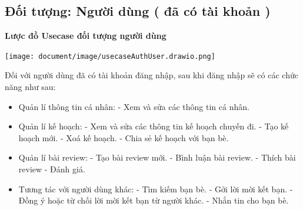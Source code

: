 \clearpage
\subsection{Đối tượng: Người dùng ( đã có tài khoản )}
\textbf{Lược đồ Usecase đối tượng người dùng}
\begin{center}
  \captionsetup{type=figure}
  \texttt{[image: document/image/usecaseAuthUser.drawio.png]}
\end{center}

Đối với người dùng đã có tài khoản đăng nhập, sau khi đăng nhập sẽ  có các chức năng như sau: 
\begin{itemize}
    \item Quản lí thông tin cá nhân:
        \subitem - Xem và sửa các thông tin cá nhân.
    \item Quản lí kế hoạch:
        \subitem - Xem và sửa các thông tin kế hoạch chuyến đi.
        \subitem - Tạo kế hoạch mới.
        \subitem - Xoá kế hoạch.
        \subitem - Chia sẻ kế hoạch với bạn bè.
        
    \item Quản lí bài review:
        \subitem - Tạo bài review mới.
        \subitem - Bình luận bài review.
        \subitem - Thích bài review
        \subitem - Đánh giá.
    \item Tương tác với người dùng khác: 
    \subitem - Tìm kiếm bạn bè.
    \subitem - Gởi lời mời kết bạn.
    \subitem - Đồng ý hoặc từ chối lời mời kết bạn từ người khác.
    \subitem - Nhắn tin cho bạn bè.
     
    
\end{itemize}

\clearpage



